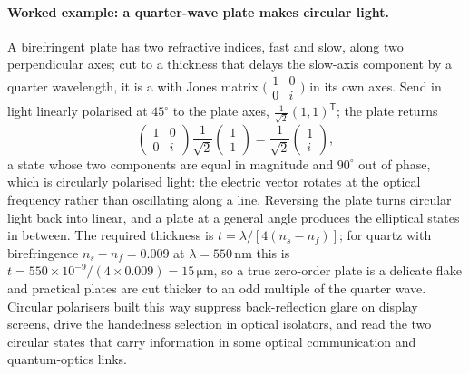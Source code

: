\paragraph{Worked example: a quarter-wave plate makes circular light.} A
birefringent plate has two refractive indices, fast and slow, along two
perpendicular axes; cut to a thickness that delays the slow-axis component by a
quarter wavelength, it is a  with Jones matrix
$\big(\begin{smallmatrix} 1 & 0 \\ 0 & i\end{smallmatrix}\big)$ in its own
axes. Send in light linearly polarised at $45^{\circ}$ to the plate axes,
$\tfrac{1}{\sqrt{2}}(1,1)^{\mathsf{T}}$; the plate returns
\[
\begin{pmatrix} 1 & 0 \\ 0 & i \end{pmatrix}
\frac{1}{\sqrt{2}}\begin{pmatrix} 1 \\ 1 \end{pmatrix}
= \frac{1}{\sqrt{2}}\begin{pmatrix} 1 \\ i \end{pmatrix},
\]
a state whose two components are equal in magnitude and $90^{\circ}$ out of
phase, which is circularly polarised light: the electric vector rotates at the
optical frequency rather than oscillating along a line. Reversing the plate
turns circular light back into linear, and a plate at a general angle produces
the elliptical states in between. The required thickness is
$t = \lambda/[4(n_s - n_f)]$; for quartz with birefringence
$n_s - n_f = 0.009$ at $\lambda = 550\,\si{\nano\meter}$ this is
$t = 550\times 10^{-9}/(4\times 0.009) = 15\,\si{\micro\meter}$, so a true
zero-order plate is a delicate flake and practical plates are cut thicker to an
odd multiple of the quarter wave. Circular polarisers built this way suppress
back-reflection glare on display screens, drive the handedness selection in
optical isolators, and read the two circular states that carry information in
some optical communication and quantum-optics links.

